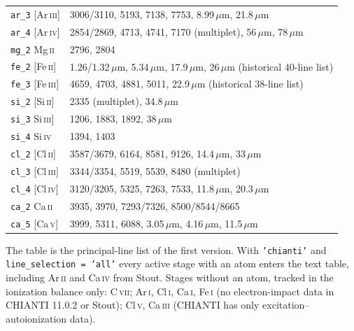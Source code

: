 \documentclass[english,a4paper]{my_memo}
\newcommand{\code}[1]{\texttt{#1}}
\begin{document}
\begin{longtable}{@{}l p{10.8cm}@{}}
\midrule
\code{ar\_3} [Ar\,\textsc{iii}]& 3006/3110, 5193, 7138, 7753, 8.99\,$\mu$m, 21.8\,$\mu$m \\
\code{ar\_4} [Ar\,\textsc{iv}] & 2854/2869, 4713, 4741, 7170 (multiplet), 56\,$\mu$m, 78\,$\mu$m \\
\code{mg\_2} Mg\,\textsc{ii}   & 2796, 2804 \\
\code{fe\_2} [Fe\,\textsc{ii}] & 1.26/1.32\,$\mu$m, 5.34\,$\mu$m, 17.9\,$\mu$m, 26\,$\mu$m (historical 40-line list) \\
\code{fe\_3} [Fe\,\textsc{iii}]& 4659, 4703, 4881, 5011, 22.9\,$\mu$m (historical 38-line list) \\
\code{si\_2} [Si\,\textsc{ii}] & 2335 (multiplet), 34.8\,$\mu$m \\
\code{si\_3} Si\,\textsc{iii}] & 1206, 1883, 1892, 38\,$\mu$m \\
\code{si\_4} Si\,\textsc{iv}   & 1394, 1403 \\
\code{cl\_2} [Cl\,\textsc{ii}] & 3587/3679, 6164, 8581, 9126, 14.4\,$\mu$m, 33\,$\mu$m \\
\code{cl\_3} [Cl\,\textsc{iii}]& 3344/3354, 5519, 5539, 8480 (multiplet) \\
\code{cl\_4} [Cl\,\textsc{iv}] & 3120/3205, 5325, 7263, 7533, 11.8\,$\mu$m, 20.3\,$\mu$m \\
\code{ca\_2} Ca\,\textsc{ii}   & 3935, 3970, 7293/7326, 8500/8544/8665 \\
\code{ca\_5} [Ca\,\textsc{v}]  & 3999, 5311, 6088, 3.05\,$\mu$m, 4.16\,$\mu$m, 11.5\,$\mu$m \\
\end{longtable}
\endgroup
\noindent\small The table is the principal-line list of the first version.
With \code{'chianti'} and \code{line\_selection = 'all'} every active
stage with an atom enters the text table, including Ar\,\textsc{ii} and
Ca\,\textsc{iv} from Stout. Stages without
an atom, tracked in the ionization balance only: C\,\textsc{vii};
Ar\,\textsc{i}, Cl\,\textsc{i}, Ca\,\textsc{i}, Fe\,\textsc{i} (no
electron-impact data in CHIANTI 11.0.2 or Stout); Cl\,\textsc{v},
Ca\,\textsc{iii} (CHIANTI has only excitation--autoionization data).\normalsize
\end{document}
